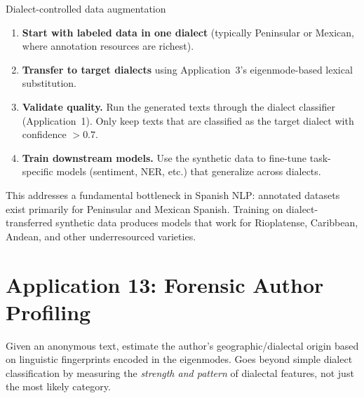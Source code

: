 \documentclass[11pt,a4paper]{article}
\begin{document}
\begin{howbox}{Dialect-controlled data augmentation}
\begin{enumerate}[nosep]
  \item \textbf{Start with labeled data in one dialect} (typically
    Peninsular or Mexican, where annotation resources are richest).

  \item \textbf{Transfer to target dialects} using Application~3's
    eigenmode-based lexical substitution.

  \item \textbf{Validate quality.} Run the generated texts through
    the dialect classifier (Application~1). Only keep texts that are
    classified as the target dialect with confidence $> 0.7$.

  \item \textbf{Train downstream models.} Use the synthetic data to
    fine-tune task-specific models (sentiment, NER, etc.) that
    generalize across dialects.
\end{enumerate}
\end{howbox}

This addresses a fundamental bottleneck in Spanish NLP: annotated
datasets exist primarily for Peninsular and Mexican Spanish. Training
on dialect-transferred synthetic data produces models that work for
Rioplatense, Caribbean, Andean, and other underresourced varieties.

\section{Application 13: Forensic Author Profiling}
\label{sec:app-forensic}

\begin{appbox}
Given an anonymous text, estimate the author's geographic/dialectal
origin based on linguistic fingerprints encoded in the eigenmodes.
Goes beyond simple dialect classification by measuring the
\emph{strength and pattern} of dialectal features, not just the
most likely category.
\end{appbox}
\end{document}
